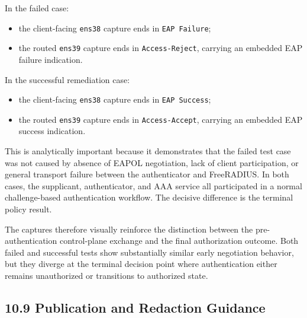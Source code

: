 \documentclass[11pt]{article}
\begin{document}
In the failed case:
\begin{itemize}
    \item the client-facing \texttt{ens38} capture ends in \texttt{EAP Failure};
    \item the routed \texttt{ens39} capture ends in \texttt{Access-Reject}, carrying an embedded EAP failure indication.
\end{itemize}

In the successful remediation case:
\begin{itemize}
    \item the client-facing \texttt{ens38} capture ends in \texttt{EAP Success};
    \item the routed \texttt{ens39} capture ends in \texttt{Access-Accept}, carrying an embedded EAP success indication.
\end{itemize}

This is analytically important because it demonstrates that the failed test case was not caused by absence of EAPOL negotiation, lack of client participation, or general transport failure between the authenticator and FreeRADIUS. In both cases, the supplicant, authenticator, and AAA service all participated in a normal challenge-based authentication workflow. The decisive difference is the terminal policy result.

The captures therefore visually reinforce the distinction between the pre-authentication control-plane exchange and the final authorization outcome. Both failed and successful tests show substantially similar early negotiation behavior, but they diverge at the terminal decision point where authentication either remains unauthorized or transitions to authorized state.


\subsection{10.9 Publication and Redaction Guidance}
\label{sec:publication-and-redaction-guidance}
\end{document}
